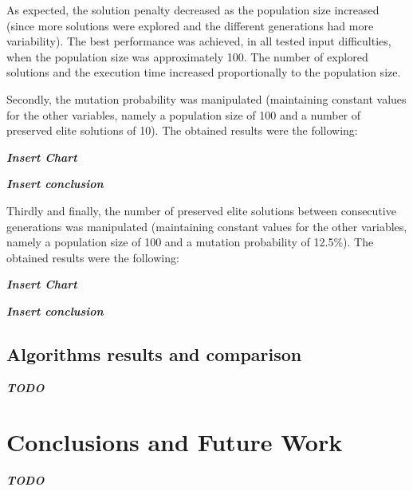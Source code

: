\documentclass[conference]{IEEEtran}
\begin{document}
As expected, the solution penalty decreased as the population size increased (since more solutions were explored and the different generations had more variability). The best performance was achieved, in all tested input difficulties, when the population size was approximately 100. The number of explored solutions and the execution time increased proportionally to the population size. 

Secondly, the mutation probability was manipulated (maintaining constant values for the other variables, namely a population size of 100 and a number of preserved elite solutions of 10). The obtained results were the following: 

\textbf{\textit{Insert Chart}}

\textbf{\textit{Insert conclusion}}

Thirdly and finally, the number of preserved elite solutions between consecutive generations was manipulated (maintaining constant values for the other variables, namely a population size of 100 and a mutation probability of 12.5\%). The obtained results were the following: 

\textbf{\textit{Insert Chart}}

\textbf{\textit{Insert conclusion}}

\subsection{Algorithms results and comparison}

\textbf{\textit{TODO}}

\section{Conclusions and Future Work}

\textbf{\textit{TODO}}

\begin{thebibliography}{00}
    



\end{thebibliography}
\end{document}
